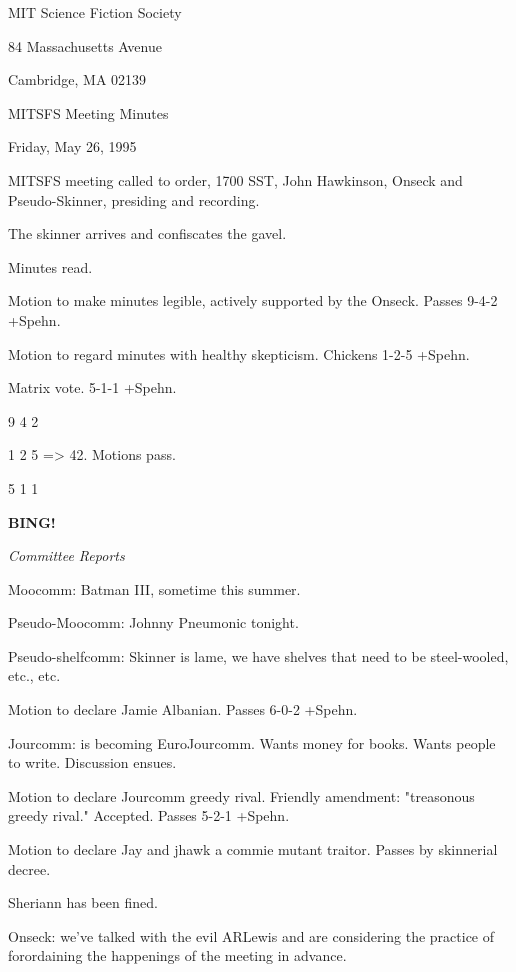 \documentclass[12pt]{article}
\newcommand{\bing}{{\bf BING!} }
\newcommand{\goto}[1]{\bing \vskip 12pt \centerline{{\em{#1}}}}
\begin{document}
\begin{center}

MIT Science Fiction Society 

84 Massachusetts Avenue

Cambridge, MA 02139

\vspace{12pt}

MITSFS Meeting Minutes 

Friday, May 26, 1995

\end{center}
 
\vspace{18pt}

\setlength{\parskip}{6pt}

\noindent
MITSFS meeting called to order, 1700 SST,
John Hawkinson, Onseck and Pseudo-Skinner, presiding and recording.

The skinner arrives and confiscates the gavel.

Minutes read.

Motion to make minutes legible, actively supported by the Onseck. Passes 9-4-2 +Spehn.

Motion to regard minutes with healthy skepticism. Chickens 1-2-5 +Spehn.

Matrix vote. 5-1-1 +Spehn.

9 4 2

1 2 5 => 42. Motions pass.

5 1 1

\goto{Committee Reports}

Moocomm: Batman III, sometime this summer.

Pseudo-Moocomm: Johnny Pneumonic tonight.

Pseudo-shelfcomm: Skinner is lame, we have shelves that need to be steel-wooled, etc., etc.

Motion to declare Jamie Albanian. Passes 6-0-2 +Spehn.

Jourcomm: is becoming EuroJourcomm. Wants money for books. Wants people to write. Discussion ensues.

Motion to declare Jourcomm greedy rival. Friendly amendment: "treasonous greedy rival." Accepted. Passes 5-2-1 +Spehn.

Motion to declare Jay and jhawk a commie mutant traitor. Passes by skinnerial decree.

Sheriann has been fined.

Onseck: we've talked with the evil ARLewis and are considering the practice of forordaining the happenings of the meeting in advance.
\end{document}
